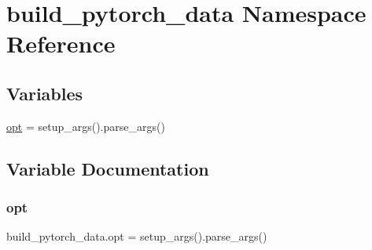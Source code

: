 \hypertarget{namespacebuild__pytorch__data}{}\section{build\+\_\+pytorch\+\_\+data Namespace Reference}
\label{namespacebuild__pytorch__data}
\subsection*{Variables}
\begin{DoxyCompactItemize}
\item 
\hyperlink{namespacebuild__pytorch__data_a2fd757855fdcf2e90fd5b713480bf494}{opt} = setup\+\_\+args().parse\+\_\+args()
\end{DoxyCompactItemize}


\subsection{Variable Documentation}
\mbox{\label{namespacebuild__pytorch__data_a2fd757855fdcf2e90fd5b713480bf494}} 
\subsubsection{\texorpdfstring{opt}{opt}}
{\footnotesize\ttfamily build\+\_\+pytorch\+\_\+data.\+opt = setup\+\_\+args().parse\+\_\+args()}

